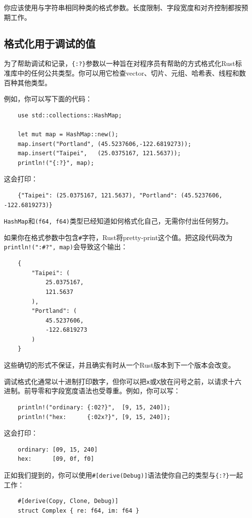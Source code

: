 你应该使用与字符串相同种类的格式参数。长度限制、字段宽度和对齐控制都按预期工作。

\subsection{格式化用于调试的值}

为了帮助调试和记录，\texttt{\{:?\}}参数以一种旨在对程序员有帮助的方式格式化Rust标准库中的任何公共类型。你可以用它检查vector、切片、元组、哈希表、线程和数百种其他类型。

例如，你可以写下面的代码：
\begin{verbatim}
    use std::collections::HashMap;

    let mut map = HashMap::new();
    map.insert("Portland", (45.5237606,-122.6819273));
    map.insert("Taipei",   (25.0375167, 121.5637));
    println!("{:?}", map);
\end{verbatim}

这会打印：
\begin{verbatim}
    {"Taipei": (25.0375167, 121.5637), "Portland": (45.5237606, -122.6819273)}
\end{verbatim}

\texttt{HashMap}和\texttt{(f64, f64)}类型已经知道如何格式化自己，无需你付出任何努力。

如果你在格式参数中包含\texttt{\#}字符，Rust将pretty-print这个值。把这段代码改为\texttt{println!("{:\#?}", map)}会导致这个输出：
\begin{verbatim}
    {
        "Taipei": (
            25.0375167,
            121.5637
        ),
        "Portland": (
            45.5237606,
            -122.6819273
        )
    }
\end{verbatim}

这些确切的形式不保证，并且确实有时从一个Rust版本到下一个版本会改变。

调试格式化通常以十进制打印数字，但你可以把\texttt{x}或\texttt{X}放在问号之前，以请求十六进制。前导零和字段宽度语法也受尊重。例如，你可以写：
\begin{verbatim}
    println!("ordinary: {:02?}",  [9, 15, 240]);
    println!("hex:      {:02x?}", [9, 15, 240]);
\end{verbatim}

这会打印：
\begin{verbatim}
    ordinary: [09, 15, 240]
    hex:      [09, 0f, f0]
\end{verbatim}

正如我们提到的，你可以使用\texttt{\#[derive(Debug)]}语法使你自己的类型与\texttt{\{:?\}}一起工作：
\begin{verbatim}
    #[derive(Copy, Clone, Debug)]
    struct Complex { re: f64, im: f64 }
\end{verbatim}

